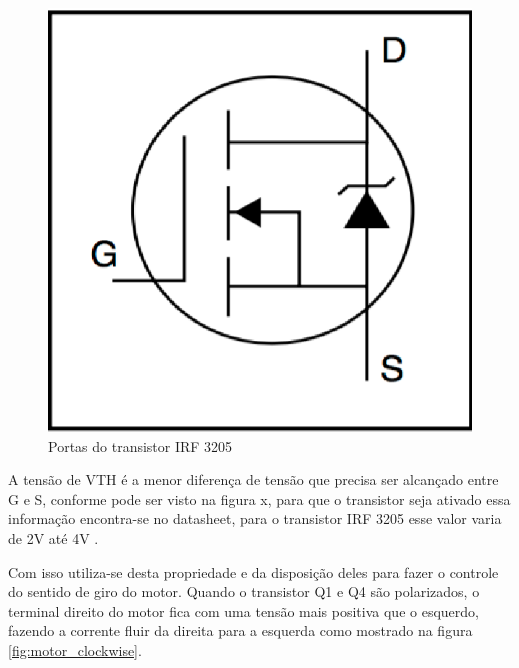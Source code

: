 \begin{figure}[!htb]
	\centering
	\includegraphics[keepaspectratio=true,scale=0.8]{figuras/referencialteorico/portas_irf_3205}
	\caption{Portas do transistor IRF 3205 \cite{datasheet_irf_3205}}
	\label{fig:portas_transistor_irf}
\end{figure}

A tensão de VTH é a menor diferença de tensão que precisa ser alcançado entre G e S, conforme pode ser visto na figura x, para que o transistor seja ativado essa informação encontra-se no datasheet, para o transistor IRF 3205 esse valor varia de 2V até 4V \cite{datasheet_irf_3205}.

Com isso utiliza-se desta propriedade e da disposição deles para fazer o controle do sentido de giro do motor. Quando o transistor Q1 e Q4 são polarizados, o terminal direito do motor fica com uma tensão mais positiva que o esquerdo, fazendo a corrente fluir da direita para a esquerda como mostrado na figura \ref{fig:motor_clockwise}.

